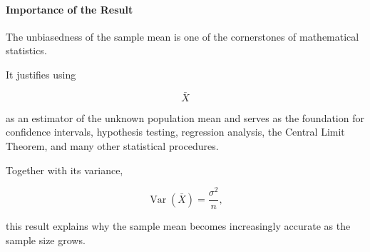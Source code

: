 \documentclass[11pt]{article}
\begin{document}
\begin{mdframed}[
		linewidth=0.8pt,
		roundcorner=6pt,
		backgroundcolor=gray!5,
		linecolor=gray!60,
		innertopmargin=10pt,
		innerbottommargin=10pt,
		innerleftmargin=10pt,
		innerrightmargin=10pt
		]
		\paragraph{Importance of the Result}
		
		The unbiasedness of the sample mean is one of the cornerstones of
		mathematical statistics.
		
		It justifies using
		
		\[
		\bar X
		\]
		
		as an estimator of the unknown population mean and serves as the foundation
		for confidence intervals, hypothesis testing, regression analysis, the
		Central Limit Theorem, and many other statistical procedures.
		
		Together with its variance,
		
		\[
		\operatorname{Var}(\bar X)=\frac{\sigma^2}{n},
		\]
		
		this result explains why the sample mean becomes increasingly accurate as
		the sample size grows.
		
	\end{mdframed}
	
	
\end{document}
